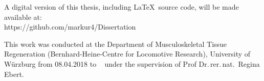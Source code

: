 \vspace*{\fill} %
\begin{center}
A digital version of this thesis, including \LaTeX~source code, will be made
available at:\\
https://github.com/markur4/Dissertation

\vspace{\vdouble}

This work was conducted at the Department of Musculoskeletal Tissue
Regeneration (Bernhard-Heine-Centre for Locomotive Research), University
of Würzburg from 08.04.2018 to 
\DTMtoday~ under the supervision of Prof Dr.\,rer.\,nat.~Regina Ebert.
\end{center}


\thispagestyle{empty} %